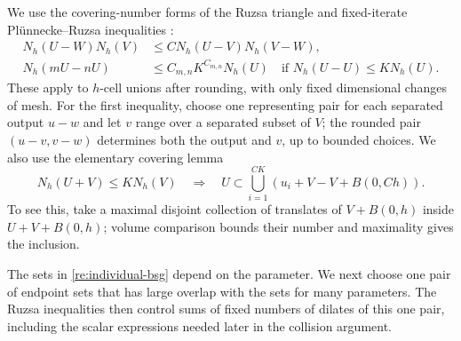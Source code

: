 We use the covering-number forms of the Ruzsa triangle and fixed-iterate
Pl\"unnecke--Ruzsa inequalities \citep{TaoVu2006}:
\begin{align}
 N_h(U-W)N_h(V)&\le C N_h(U-V)N_h(V-W),
 \label{re:ruzsa-triangle}\\
 N_h(mU-nU)&\le C_{m,n}K^{C_{m,n}}N_h(U)
 \quad\text{if }N_h(U-U)\le K N_h(U).
 \label{re:iterate}
\end{align}
These apply to \(h\)-cell unions after rounding, with only fixed
dimensional changes of mesh.  For the first inequality, choose one
representing pair for each separated output \(u-w\) and let \(v\)
range over a separated subset of \(V\); the rounded pair
\((u-v,v-w)\) determines both the output and \(v\), up to bounded
choices.  We also use the elementary covering lemma
\begin{equation}\label{re:covering}
 N_h(U+V)\le K N_h(V)
 \quad\Longrightarrow\quad
 U\subset\bigcup_{i=1}^{CK}(u_i+V-V+B(0,Ch)).
\end{equation}
To see this, take a maximal disjoint collection of translates of
\(V+B(0,h)\) inside \(U+V+B(0,h)\); volume comparison bounds their
number and maximality gives the inclusion.

The sets in \eqref{re:individual-bsg} depend on the parameter.  We next
choose one pair of endpoint sets that has large overlap with the sets
for many parameters.  The Ruzsa inequalities then control sums of
fixed numbers of dilates of this one pair, including the scalar
expressions needed later in the collision argument.


